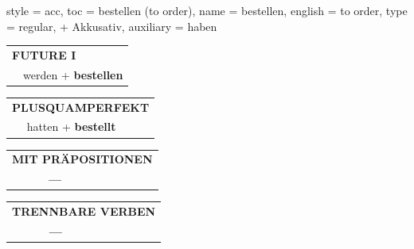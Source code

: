 \begin{verbentry}{
  style = {acc},
  toc = {bestellen (to order)},
  name = {bestellen},
  english = {to order},
  type = {regular, + Akkusativ},
  auxiliary = {haben}
}
\begin{tabular}{rl}
    \multicolumn{2}{l}{\textbf{FUTURE I} }\\
   & werden + \textbf{bestellen}\\
 
  \end{tabular}
\hfill
   \begin{tabular}{rl}
      \multicolumn{2}{l}{\textbf{PLUSQUAMPERFEKT}}\\
   & hatten + \textbf{bestellt}\\
  \end{tabular}
  
 \vspace{10pt}

\begin{tabular}{lll}
\multicolumn{3}{l}{\textbf{MIT PRÄPOSITIONEN}}\\
& \textbf{---} & \\
\end{tabular}
\hfill
\begin{tabular}{lll}
\multicolumn{3}{l}{\textbf{TRENNBARE VERBEN}}\\
& \textbf{---} & \\
\end{tabular}

\vspace{-5pt}
\end{verbentry}

